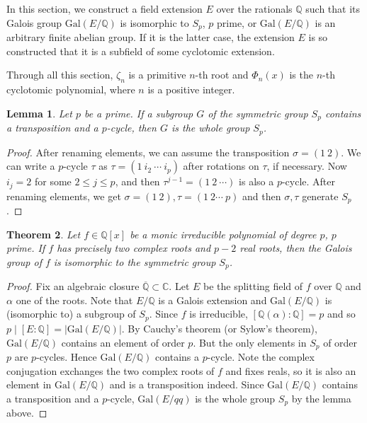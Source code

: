 \documentclass[12pt]{report}
\newtheorem{theorem}{Theorem}[section]
\newtheorem{lemma}[theorem]{Lemma}
\theoremstyle{definition}
\newcommand{\gal}{\text{Gal}}
\newcommand{\cc}{\mathbb{C}}
\newcommand{\qq}{\mathbb{Q}}
\begin{document}
In this section, we construct a field extension $E$ over the rationals $\qq$ such that its Galois group $\gal(E/\qq)$ is isomorphic to $S_p$, $p$ prime, or $\gal(E/\qq)$ is an arbitrary finite abelian group. If it is the latter case, the extension $E$ is so constructed that it is a subfield of some cyclotomic extension.

Through all this section, $\zeta_n$ is a primitive $n$-th root and $\Phi_n(x)$ is the $n$-th cyclotomic polynomial, where $n$ is a positive integer.


\begin{lemma}
	Let $p$ be a prime. If a subgroup $G$ of the symmetric group $S_p$ contains a transposition and a $p$-cycle, then $G$ is the whole group $S_p$.
\end{lemma}

\begin{proof}
	After renaming elements, we can assume the transposition $\sigma=(1~ 2)$. We can write a $p$-cycle $\tau$ as $\tau=(1~ i_2 ~\cdots ~i_p)$ after rotations on $\tau$, if necessary. Now $i_j=2$ for some $2\leq j\leq p$, and then $\tau^{j-1}=(1~2~\cdots)$ is also a $p$-cycle. After renaming elements, we get $\sigma=(1~2), \tau=(1~2\cdots~p)$ and then $\sigma,\tau$ generate $S_p$.
\end{proof}

\begin{theorem}\label{symgal}
	Let $f\in\qq[x]$ be a monic irreducible polynomial of degree $p$, $p$ prime. If $f$ has precisely two complex roots and $p-2$ real roots, then the Galois group of $f$ is isomorphic to the symmetric group $S_p$.
\end{theorem}

\begin{proof}
	Fix an algebraic closure $\overline{\qq}\subset\cc$. Let $E$ be the splitting field of $f$ over $\qq$ and $\alpha$ one of the roots. Note that $E/\qq$ is a Galois extension and $\gal(E/\qq)$ is (isomorphic to) a subgroup of $S_p$. Since $f$ is irreducible, $[\qq(\alpha):\qq ]=p$ and so $p\mid \left[ E:\qq\right]=|\gal(E/\qq)|$. By Cauchy's theorem (or Sylow's theorem), $\gal(E/\qq)$ contains an element of order $p$. But the only elements in $S_p$ of order $p$ are $p$-cycles. Hence $\gal(E/\qq)$ contains a $p$-cycle. Note the complex conjugation exchanges the two complex roots of $f$ and fixes reals, so it is also an element in $\gal(E/\qq)$ and is a transposition indeed. Since $\gal(E/\qq)$ contains a transposition and a $p$-cycle, $\gal(E/qq)$ is the whole group $S_p$ by the lemma above.
\end{proof}
\end{document}
